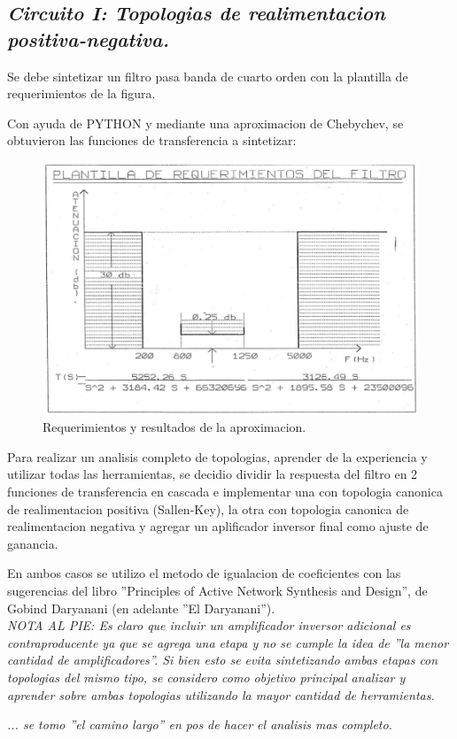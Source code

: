 \justifying
\begin{center}
    \section{
        \textit{Circuito I: Topologias de realimentacion positiva-negativa.}
    }
\end{center}

Se debe sintetizar un filtro pasa banda de cuarto orden con la plantilla de requerimientos de la figura.

Con ayuda de PYTHON y mediante una aproximacion de Chebychev, se obtuvieron las funciones de transferencia a sintetizar:

\begin{figure}[H]
    \centering
    \includegraphics[scale=.3]{Secciones/Circ1/img/plantilla.png}
    \caption{Requerimientos y resultados de la aproximacion.}
    \label{prop}
\end{figure}

Para realizar un analisis completo de topologias, aprender de la experiencia y utilizar todas las herramientas, se decidio dividir la respuesta del filtro en 2 funciones de transferencia en cascada e implementar una con topologia canonica de realimentacion positiva (Sallen-Key), la otra con topologia canonica de realimentacion negativa y agregar un aplificador inversor final como ajuste de ganancia. 

En ambos casos se utilizo el metodo de igualacion de coeficientes con las sugerencias del libro ''Principles of Active Network Synthesis and Design'', de Gobind Daryanani (en adelante ''El Daryanani''). \\

\textit{NOTA AL PIE: Es claro que incluir un amplificador inversor adicional es contraproducente ya que se agrega una etapa y no se cumple la idea de ''la menor cantidad de amplificadores''. 
Si bien esto se evita sintetizando ambas etapas con topologias del mismo tipo, se considero como objetivo principal analizar y aprender sobre ambas topologias utilizando la mayor cantidad de herramientas.}

\textit{... se tomo ''el camino largo'' en pos de hacer el analisis mas completo.}